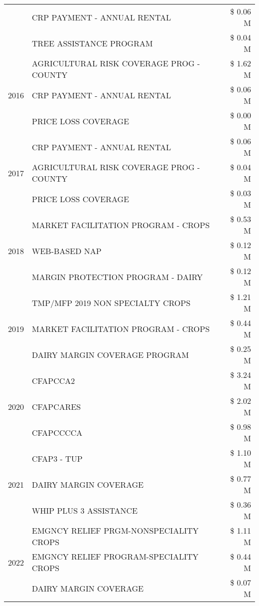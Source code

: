 \begin{tabular}{llr}
 & CRP PAYMENT - ANNUAL RENTAL & \$ 0.06 M \\
 & TREE ASSISTANCE PROGRAM & \$ 0.04 M \\
\cline{1-3}
\multirow[t]{3}{*}{2016} & AGRICULTURAL RISK COVERAGE PROG - COUNTY & \$ 1.62 M \\
 & CRP PAYMENT - ANNUAL RENTAL & \$ 0.06 M \\
 & PRICE LOSS COVERAGE & \$ 0.00 M \\
\cline{1-3}
\multirow[t]{3}{*}{2017} & CRP PAYMENT - ANNUAL RENTAL & \$ 0.06 M \\
 & AGRICULTURAL RISK COVERAGE PROG - COUNTY & \$ 0.04 M \\
 & PRICE LOSS COVERAGE & \$ 0.03 M \\
\cline{1-3}
\multirow[t]{3}{*}{2018} & MARKET FACILITATION PROGRAM - CROPS & \$ 0.53 M \\
 & WEB-BASED NAP & \$ 0.12 M \\
 & MARGIN PROTECTION PROGRAM - DAIRY & \$ 0.12 M \\
\cline{1-3}
\multirow[t]{3}{*}{2019} & TMP/MFP 2019 NON SPECIALTY CROPS & \$ 1.21 M \\
 & MARKET FACILITATION PROGRAM - CROPS & \$ 0.44 M \\
 & DAIRY MARGIN COVERAGE PROGRAM & \$ 0.25 M \\
\cline{1-3}
\multirow[t]{3}{*}{2020} & CFAPCCA2 & \$ 3.24 M \\
 & CFAPCARES & \$ 2.02 M \\
 & CFAPCCCCA & \$ 0.98 M \\
\cline{1-3}
\multirow[t]{3}{*}{2021} & CFAP3 - TUP & \$ 1.10 M \\
 & DAIRY MARGIN COVERAGE & \$ 0.77 M \\
 & WHIP PLUS 3 ASSISTANCE & \$ 0.36 M \\
\cline{1-3}
\multirow[t]{3}{*}{2022} & EMGNCY RELIEF PRGM-NONSPECIALITY CROPS & \$ 1.11 M \\
 & EMGNCY RELIEF PROGRAM-SPECIALITY CROPS & \$ 0.44 M \\
 & DAIRY MARGIN COVERAGE & \$ 0.07 M \\
\cline{1-3}
\bottomrule
\end{tabular}
